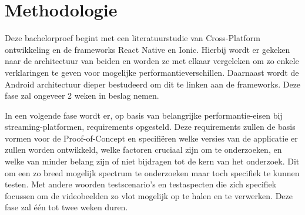 




\section{Methodologie}%
\label{sec:methodologie}

Deze bachelorproef begint met een literatuurstudie van Cross-Platform ontwikkeling en de frameworks React Native en Ionic. Hierbij wordt er gekeken naar de architectuur van beiden en worden ze met elkaar vergeleken om zo enkele verklaringen te geven voor mogelijke performantieverschillen. Daarnaast wordt de Android architectuur dieper bestudeerd om dit te linken aan de frameworks. Deze fase zal ongeveer 2 weken in beslag nemen.

In een volgende fase wordt er, op basis van belangrijke performantie-eisen bij streaming-platformen, requirements opgesteld. Deze requirements zullen de basis vormen voor de Proof-of-Concept en specifiëren welke versies van de applicatie er zullen worden ontwikkeld, welke factoren cruciaal zijn om te onderzoeken, en welke van minder belang zijn of niet bijdragen tot de kern van het onderzoek. Dit om een zo breed mogelijk spectrum te onderzoeken maar toch specifiek te kunnen testen. Met andere woorden testscenario's en testaspecten die zich specifiek focussen om de videobeelden zo vlot mogelijk op te halen en te verwerken. Deze fase zal één tot twee weken duren.

